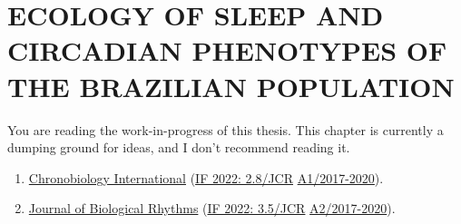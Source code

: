 \documentclass[
  12pt,
  a4paper,
  oneside]{tesesusp}
\providecommand{\tightlist}{%
  \setlength{\itemsep}{0pt}\setlength{\parskip}{0pt}}\usepackage{longtable,booktabs,array}
\begin{document}

\hypertarget{ecology-of-sleep-and-circadian-phenotypes-of-the-brazilian-population}{%
\chapter{ECOLOGY OF SLEEP AND CIRCADIAN PHENOTYPES OF THE BRAZILIAN
POPULATION}\label{ecology-of-sleep-and-circadian-phenotypes-of-the-brazilian-population}}

\begin{tcolorbox}[enhanced jigsaw, rightrule=.15mm, colback=white, colbacktitle=quarto-callout-important-color!10!white, toptitle=1mm, bottomtitle=1mm, toprule=.15mm, bottomrule=.15mm, colframe=quarto-callout-important-color-frame, opacitybacktitle=0.6, opacityback=0, coltitle=black, left=2mm, breakable, titlerule=0mm, title=\textcolor{quarto-callout-important-color}{\faExclamation}\hspace{0.5em}{Important}, arc=.35mm, leftrule=.75mm]

You are reading the work-in-progress of this thesis. This chapter is
currently a dumping ground for ideas, and I don't recommend reading it.

\end{tcolorbox}

\begin{tcolorbox}[enhanced jigsaw, rightrule=.15mm, colback=white, colbacktitle=quarto-callout-note-color!10!white, toptitle=1mm, bottomtitle=1mm, toprule=.15mm, bottomrule=.15mm, colframe=quarto-callout-note-color-frame, opacitybacktitle=0.6, opacityback=0, coltitle=black, left=2mm, breakable, titlerule=0mm, title=\textcolor{quarto-callout-note-color}{\faInfo}\hspace{0.5em}{Target}, arc=.35mm, leftrule=.75mm]

\begin{enumerate}
\def\labelenumi{\arabic{enumi}.}
\tightlist
\item
  \href{https://www.tandfonline.com/action/authorSubmission?show=instructions\&journalCode=icbi20}{Chronobiology
  International} (\href{https://jcr.clarivate.com/jcr/}{IF 2022:
  2.8/JCR} \textbar{}
  \href{https://sucupira.capes.gov.br/sucupira/public/consultas/coleta/veiculoPublicacaoQualis/listaConsultaGeralPeriodicos.jsf}{A1/2017-2020}).
\item
  \href{https://journals.sagepub.com/author-instructions/JBR}{Journal of
  Biological Rhythms} (\href{https://jcr.clarivate.com/jcr/}{IF 2022:
  3.5/JCR} \textbar{}
  \href{https://sucupira.capes.gov.br/sucupira/public/consultas/coleta/veiculoPublicacaoQualis/listaConsultaGeralPeriodicos.jsf}{A2/2017-2020}).
\end{enumerate}

\end{tcolorbox}
\end{document}
